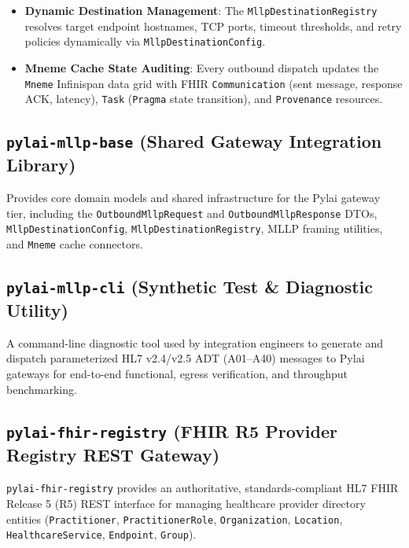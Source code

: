 \begin{itemize}
\begin{itemize}
        \item \texttt{POST /api/mllp/outbound/adt/send}: Specialized clinical ADT trigger event dispatch.
        \item \texttt{POST /api/mllp/outbound/mfn/send}: Master file notification directory dispatch.
        \item \texttt{GET /api/mllp/outbound/health}: Real-time destination connectivity and circuit health status.
    \end{itemize}
    \item \textbf{Dynamic Destination Management}: The \texttt{MllpDestinationRegistry} resolves target endpoint hostnames, TCP ports, timeout thresholds, and retry policies dynamically via \texttt{MllpDestinationConfig}.
    \item \textbf{Mneme Cache State Auditing}: Every outbound dispatch updates the \texttt{Mneme} Infinispan data grid with FHIR \texttt{Communication} (sent message, response ACK, latency), \texttt{Task} (\texttt{Pragma} state transition), and \texttt{Provenance} resources.
\end{itemize}

\subsection{\texttt{pylai-mllp-base} (Shared Gateway Integration Library)}
Provides core domain models and shared infrastructure for the Pylai gateway tier, including the \texttt{OutboundMllpRequest} and \texttt{OutboundMllpResponse} DTOs, \texttt{MllpDestinationConfig}, \texttt{MllpDestinationRegistry}, MLLP framing utilities, and \texttt{Mneme} cache connectors.

\subsection{\texttt{pylai-mllp-cli} (Synthetic Test \& Diagnostic Utility)}
A command-line diagnostic tool used by integration engineers to generate and dispatch parameterized HL7 v2.4/v2.5 ADT (A01--A40) messages to Pylai gateways for end-to-end functional, egress verification, and throughput benchmarking.

\subsection{\texttt{pylai-fhir-registry} (FHIR R5 Provider Registry REST Gateway)}
\texttt{pylai-fhir-registry} provides an authoritative, standards-compliant HL7 FHIR Release 5 (R5) REST interface for managing healthcare provider directory entities (\texttt{Practitioner}, \texttt{PractitionerRole}, \texttt{Organization}, \texttt{Location}, \texttt{HealthcareService}, \texttt{Endpoint}, \texttt{Group}).

